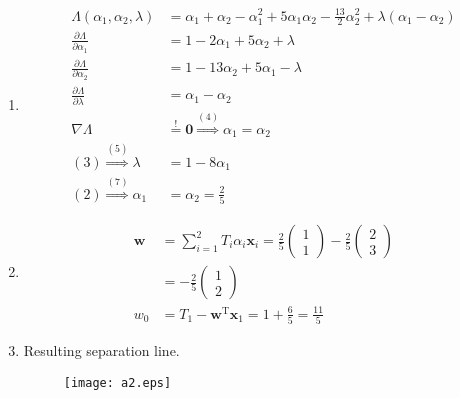 \documentclass[DIN, pagenumber=false, fontsize=11pt, parskip=half]{scrartcl}
\begin{document}
\begin{enumerate}
        \item
        \begin{align}
            \Lambda(\alpha_1, \alpha_2, \lambda) &= \alpha_1 + \alpha_2 - \alpha_1^2 + 5 \alpha_1 \alpha_2 -\frac{13}{2} \alpha_2^2 + \lambda (\alpha_1 - \alpha_2) \\
            \frac{\partial \Lambda}{\partial \alpha_1} &= 1 - 2 \alpha_1 + 5 \alpha_2 + \lambda \\
            \frac{\partial \Lambda}{\partial \alpha_2} &= 1 - 13 \alpha_2 + 5 \alpha_1 - \lambda \\
            \frac{\partial \Lambda}{\partial \lambda} &= \alpha_1 - \alpha_2 \\
            \nabla \Lambda &\stackrel{!}{=} \mathbf{0} \stackrel{(4)}{\Rightarrow} \alpha_1 = \alpha_2 \\
            (3) \stackrel{(5)}{\Rightarrow} \lambda &= 1 - 8 \alpha_1 \\
            (2) \stackrel{(7)}{\Rightarrow} \alpha_1 &= \alpha_2 = \frac{2}{5} 
        \end{align}
        \item
        \begin{align*}
            \mathbf{w} &= \sum_{i=1}^2{T_i \alpha_i \mathbf{x}_i} = \frac{2}{5} \begin{pmatrix} 1 \\ 1 \end{pmatrix} - \frac{2}{5} \begin{pmatrix} 2 \\ 3 \end{pmatrix} \\
            &= -\frac{2}{5} \begin{pmatrix} 1 \\ 2 \end{pmatrix} \\
            w_0 &= T_1 - \mathbf{w}^\text{T} \mathbf{x}_1 = 1 + \frac{6}{5} = \frac{11}{5}
        \end{align*}
        \newpage
        \item
        Resulting separation line.
        \begin{figure}[h!]
            \centering
            \texttt{[image: a2.eps]}
        \end{figure}
    \end{enumerate}
    
\end{document}
